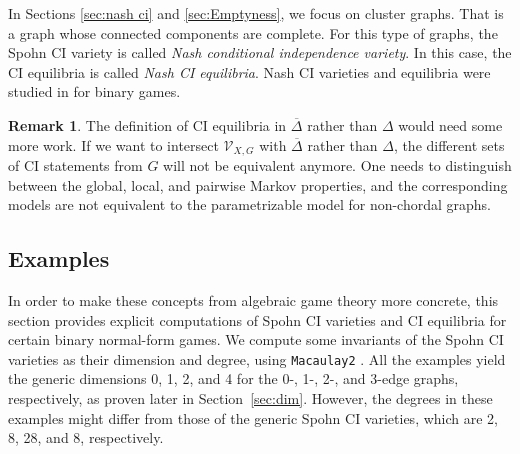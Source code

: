 \documentclass[11pt]{amsart}
\numberwithin{equation}{section}
\theoremstyle{plain}
\numberwithin{theorem}{section}
\theoremstyle{definition}
\newtheorem{remark}[theorem]{Remark}
\begin{document}
In Sections \ref{sec:nash ci} and \ref{sec:Emptyness}, we focus on cluster graphs. That is a graph whose connected components are complete. For this type of graphs, the Spohn CI variety is called \textit{Nash conditional independence variety}. In this case, the CI equilibria is called \textit{Nash CI equilibria}.
Nash CI varieties and equilibria were studied in \cite[Section 5]{portakal2024game} for binary games.



\begin{remark}
    The definition of CI equilibria in $\overline\Delta$ rather than $\Delta$ would need some more work. If we want to intersect $\mathcal V_{X,G}$ with $\overline\Delta$ rather than $\Delta$, the different sets of CI statements from $G$ will not be equivalent anymore. One needs to distinguish between the global, local, and pairwise Markov properties, and the corresponding models are not equivalent to the parametrizable model for non-chordal graphs.
\end{remark}

\subsection{Examples}\label{subsec: examples}

In order to make these concepts from algebraic game theory more concrete, this section provides explicit computations of Spohn CI varieties and CI equilibria for certain binary normal-form games. We compute some invariants of the Spohn CI varieties as their dimension and degree, using \texttt{Macaulay2} \cite{connelly2025gametheory}. All the examples yield the generic dimensions 0, 1, 2, and 4 for the 0-, 1-, 2-, and 3-edge graphs, respectively, as proven later in Section~\ref{sec:dim}. However, the degrees in these examples might differ from those of the generic Spohn CI varieties, which are 2, 8, 28, and 8, respectively.
\end{document}
